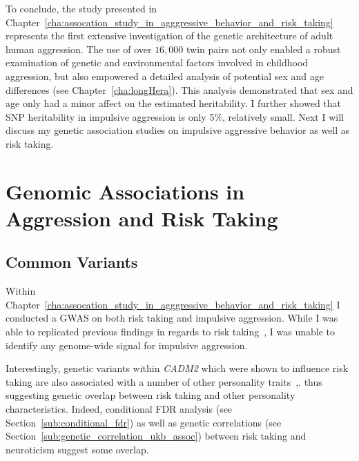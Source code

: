 To conclude, the study presented in Chapter~\ref{cha:assocation_study_in_agggressive_behavior_and_risk_taking} represents the first extensive investigation of the genetic architecture of adult human aggression.
The use of over $16,000$ twin pairs not only enabled a robust examination of genetic and environmental factors involved in childhood aggression, but also empowered a detailed analysis of potential sex and age differences (see Chapter~\ref{cha:longHera}).
This analysis demonstrated that sex and age only had a minor affect on the estimated heritability.
I further showed that SNP heritability in impulsive aggression is  only 5\%, relatively small.
Next I will discuss my genetic association studies on impulsive aggressive behavior as well as risk taking. 

\section{Genomic Associations in Aggression and Risk Taking}
\label{sec:genomic_associations_in_aggression_and_risk_taking}

\subsection{Common Variants}
\label{sub:common_variants_discussion}

Within Chapter~\ref{cha:assocation_study_in_agggressive_behavior_and_risk_taking} I conducted a GWAS on both risk taking and impulsive aggression.
While I was able to replicated previous findings in regards to risk taking~\cite{Day2016}, I was unable to identify any genome-wide signal for impulsive aggression.

Interestingly, genetic variants within \textit{CADM2} which were shown to influence risk taking are also associated with a number of other personality traits~\cite{Boutwell2017},.
thus suggesting genetic overlap between risk taking and other personality characteristics.
Indeed, conditional FDR analysis (see Section~\ref{sub:conditional_fdr}) as well as genetic correlations (see Section~\ref{sub:genetic_correlation_ukb_assoc}) between risk taking and neuroticism suggest some overlap.

